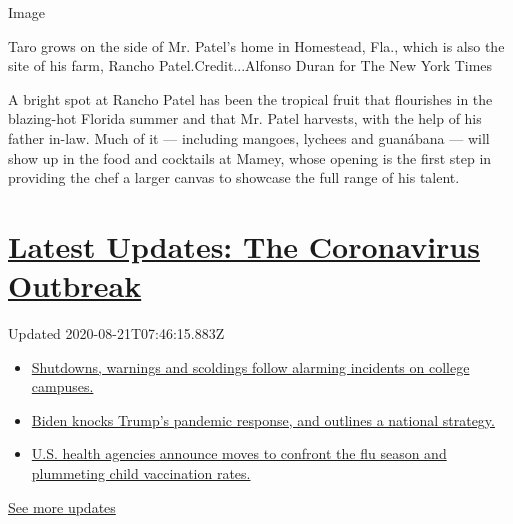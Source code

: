 Image

Taro grows on the side of Mr. Patel's home in Homestead, Fla., which is
also the site of his farm, Rancho Patel.Credit...Alfonso Duran for The
New York Times

A bright spot at Rancho Patel has been the tropical fruit that
flourishes in the blazing-hot Florida summer and that Mr. Patel
harvests, with the help of his father in-law. Much of it --- including
mangoes, lychees and guanábana --- will show up in the food and
cocktails at Mamey, whose opening is the first step in providing the
chef a larger canvas to showcase the full range of his talent.

\hypertarget{latest-updates-the-coronavirus-outbreak}{%
\section{\texorpdfstring{\href{https://www.nytimes3xbfgragh.onion/2020/08/20/world/coronavirus-covid.html?action=click\&pgtype=Article\&state=default\&region=MAIN_CONTENT_1\&context=storylines_live_updates}{Latest
Updates: The Coronavirus
Outbreak}}{Latest Updates: The Coronavirus Outbreak}}\label{latest-updates-the-coronavirus-outbreak}}

Updated 2020-08-21T07:46:15.883Z

\begin{itemize}
\tightlist
\item
  \href{https://www.nytimes3xbfgragh.onion/2020/08/20/world/coronavirus-covid.html?action=click\&pgtype=Article\&state=default\&region=MAIN_CONTENT_1\&context=storylines_live_updates\#link-68774d88}{Shutdowns,
  warnings and scoldings follow alarming incidents on college campuses.}
\item
  \href{https://www.nytimes3xbfgragh.onion/2020/08/20/world/coronavirus-covid.html?action=click\&pgtype=Article\&state=default\&region=MAIN_CONTENT_1\&context=storylines_live_updates\#link-26b58724}{Biden
  knocks Trump's pandemic response, and outlines a national strategy.}
\item
  \href{https://www.nytimes3xbfgragh.onion/2020/08/20/world/coronavirus-covid.html?action=click\&pgtype=Article\&state=default\&region=MAIN_CONTENT_1\&context=storylines_live_updates\#link-4e542da3}{U.S.
  health agencies announce moves to confront the flu season and
  plummeting child vaccination rates.}
\end{itemize}

\href{https://www.nytimes3xbfgragh.onion/2020/08/20/world/coronavirus-covid.html?action=click\&pgtype=Article\&state=default\&region=MAIN_CONTENT_1\&context=storylines_live_updates}{See
more updates}

